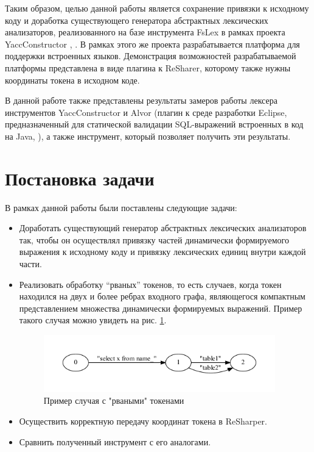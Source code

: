 \documentclass{matmex-diploma}
\begin{document}
Таким образом, целью данной работы является сохранение привязки к исходному коду и доработка существующего генератора абстрактных лексических 
анализаторов, реализованного на базе инструмента FsLex \cite{FsLex} в рамках проекта YaccConstructor \cite{YC}, \cite{YC_article}. В рамках 
этого же проекта разрабатывается платформа для поддержки встроенных языков. Демонстрация возможностей разрабатываемой платформы представлена в виде 
плагина к ReSharer, которому также нужны координаты токена в исходном коде. 

В данной работе также представлены результаты замеров работы лексера инструментов YaccConstructor и Alvor (плагин к среде разработки Eclipse,
предназначенный для статической валидации SQL-выражений встроенных в код на Java, \cite{Alvor}), а также инструмент, который позволяет получить 
эти результаты.



\section{Постановка задачи}
В рамках данной работы были поставлены следующие задачи:
\begin{itemize}
\item Доработать существующий генератор абстрактных лексических анализаторов так, чтобы он осуществлял привязку частей динамически 
формируемого выражения к исходному коду и привязку лексических единиц внутри каждой части.
\item Реализовать обработку “рваных” токенов, то есть случаев, когда токен находился на двух и более ребрах входного графа, являющегося 
компактным представлением множества динамически формируемых выражений. Пример такого случая можно увидеть на рис. \ref{fig:example_break}.

\begin{figure}[h!]
\begin{center}
\includegraphics[width=0.95\textwidth]{example_break}
\caption{Пример случая с "рваными" токенами}
\label{fig:example_break} 
\end{center}
\end{figure}

\item Осуществить корректную передачу координат токена в ReSharper.
\item Сравнить полученный инструмент с его аналогами.
\end{itemize}
\end{document}
